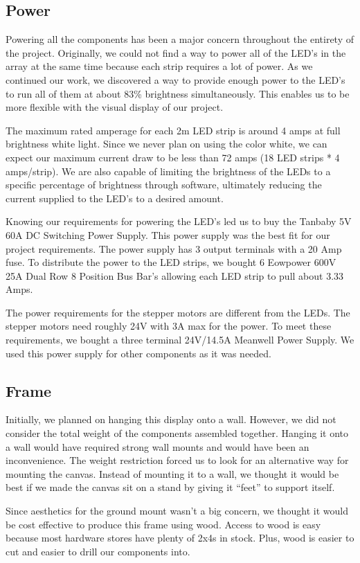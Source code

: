 \documentclass[12pt]{article}
\begin{document}
\subsection{Power}
Powering all the components has been a major concern throughout the entirety of the project. Originally, we could not find a way to power all of the LED’s in the array at the same time because each strip requires a lot of power. As we continued our work, we discovered a way to provide enough power to the LED’s to run all of them at about 83\% brightness simultaneously. This enables us to be more flexible with the visual display of our project. 

The maximum rated amperage for each 2m LED strip is around 4 amps at full brightness white light. Since we never plan on using the color white, we can expect our maximum current draw to be less than 72 amps (18 LED strips * 4 amps/strip). We are also capable of limiting the brightness of the LEDs to a specific percentage of brightness through software, ultimately reducing the current supplied to the LED’s to a desired amount.

Knowing our requirements for powering the LED’s led us to buy the Tanbaby 5V 60A DC Switching Power Supply. This power supply was the best fit for our project requirements. The power supply has 3 output terminals with a 20 Amp fuse. To distribute the power to the LED strips, we bought 6 Eowpower 600V 25A Dual Row 8 Position Bus Bar’s allowing each LED strip to pull about 3.33 Amps.

The power requirements for the stepper motors are different from the LEDs. The stepper motors need roughly 24V with 3A max for the power. To meet these requirements, we bought a three terminal 24V/14.5A Meanwell Power Supply. We used this power supply for other components as it was needed.

\subsection{Frame}
Initially, we planned on hanging this display onto a wall. However, we did not consider the total weight of the components assembled together. Hanging it onto a wall would have required strong wall mounts and would have been an inconvenience. The weight restriction forced us to look for an alternative way for mounting the canvas. Instead of mounting it to a wall, we thought it would be best if we made the canvas sit on a stand by giving it “feet” to support itself. 

Since aesthetics for the ground mount wasn’t a big concern, we thought it would be cost effective to produce this frame using wood. Access to wood is easy because most hardware stores have plenty of 2x4s in stock. Plus, wood is easier to cut and easier to drill our components into.
\end{document}
